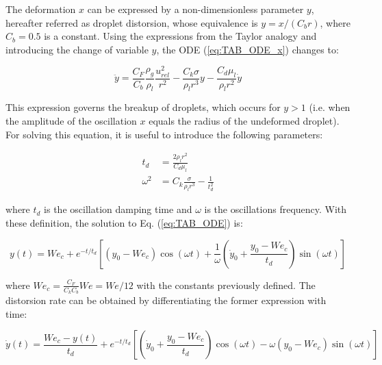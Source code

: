 The deformation $x$ can be expressed by a non-dimensionless parameter $y$, hereafter referred as droplet distorsion, whose equivalence is $y = x / \left( C_b r \right)$, where $C_b = 0.5$ is a constant. Using the expressions from the Taylor analogy and introducing the change of variable $y$, the ODE (\ref{eq:TAB_ODE_x}) changes to:

\begin{equation}
\label{eq:TAB_ODE}
\ddot{y} = \frac{C_F}{C_b} \frac{\rho_g}{\rho_l} \frac{u_{rel}^2}{r^2} - \frac{C_k \sigma}{\rho_l r^3} y - \frac{C_d \mu_l}{\rho_l r^2} \dot{y}
\end{equation}

This expression governs the breakup of droplets, which occurs for $y > 1$ (i.e. when the amplitude of the oscillation $x$ equals the radius of the undeformed droplet). For solving this equation, it is useful to introduce the following parameters:

\begin{subequations}
\label{eq:TAB_td_omega_definition}
\begin{align}
t_d &= \frac{2 \rho_l r^2}{C_d \mu_l} \\
\omega^2 &= C_k \frac{\sigma}{\rho_l r^3} - \frac{1}{t_d^2}
\end{align}
\end{subequations}

where $t_d$ is the oscillation damping time and $\omega$ is the oscillations frequency. With these definition, the solution to Eq. (\ref{eq:TAB_ODE}) is:

\begin{equation}
\label{eq:yTAB_equation_general}
y \left( t \right) = We_c + e^{- t / t_d} \left[ \left( y_0 - We_c \right) \cos \left( \omega t \right) + \frac{1}{\omega}\left( \dot{y}_0 + \frac{y_0 - We_c}{t_d} \right) \sin \left( \omega t \right)   \right]
\end{equation}

where $We_c = \frac{C_F}{C_k C_b} We = We / 12$ with the constants previously defined. The distorsion rate can be obtained by differentiating the former expression with time:

\begin{equation}
\label{eq:dydtTAB_equation_general}
\dot{y} \left( t \right) = \frac{We_c - y \left( t \right) }{t_d} + e^{- t / t_d} \left[ \left( \dot{y}_0 + \frac{y_0 - We_c}{t_d} \right) \cos \left( \omega t \right) - \omega \left( y_0 - We_c \right) \sin \left( \omega t \right)  \right]
\end{equation}

